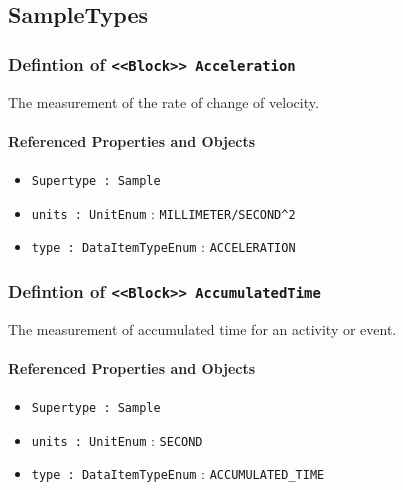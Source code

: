 \subsection{SampleTypes} \label{model:SampleTypes}
\subsubsection{Defintion of \texttt{<<Block>> Acceleration}}
  \label{type:Acceleration}

\FloatBarrier

The measurement of the rate of change of velocity.

\FloatBarrier
\paragraph{Referenced Properties and Objects}

\begin{itemize}
\item \texttt{Supertype : Sample}

\item \texttt{units : UnitEnum} : \texttt{MILLIMETER/SECOND^2}

\item \texttt{type : DataItemTypeEnum} : \texttt{ACCELERATION}

\end{itemize}
\FloatBarrier
\subsubsection{Defintion of \texttt{<<Block>> AccumulatedTime}}
  \label{type:AccumulatedTime}

\FloatBarrier

The measurement of accumulated time for an activity or event.

\FloatBarrier
\paragraph{Referenced Properties and Objects}

\begin{itemize}
\item \texttt{Supertype : Sample}

\item \texttt{units : UnitEnum} : \texttt{SECOND}

\item \texttt{type : DataItemTypeEnum} : \texttt{ACCUMULATED_TIME}

\end{itemize}
\FloatBarrier
